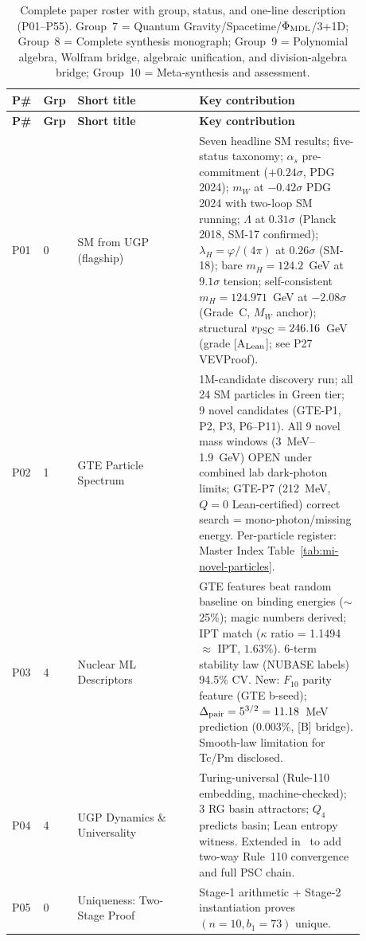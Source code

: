 \documentclass[11pt]{article}
\begin{document}
\footnotesize
\begin{longtable}{@{}P{0.05\linewidth}P{0.05\linewidth}P{0.33\linewidth}P{0.45\linewidth}@{}}
\caption{Complete paper roster with group, status, and one-line description (P01--P55). Group~7 = Quantum Gravity/Spacetime/$\Phi_{\rm MDL}$/3+1D; Group~8 = Complete synthesis monograph; Group~9 = Polynomial algebra, Wolfram bridge, algebraic unification, and division-algebra bridge; Group~10 = Meta-synthesis and assessment.}
\label{tab:all_papers}\\
\toprule
\textbf{P\#} & \textbf{Grp} & \textbf{Short title} & \textbf{Key contribution} \\
\midrule
\endfirsthead
\toprule
\textbf{P\#} & \textbf{Grp} & \textbf{Short title} & \textbf{Key contribution} \\
\midrule
\endhead
\bottomrule
\endfoot
P01 & 0 & SM from UGP (flagship) & Seven headline SM results; five-status taxonomy; $\alpha_s$ pre-commitment ($+0.24\sigma$, PDG 2024); $m_W$ at $-0.42\sigma$ PDG 2024 with two-loop SM running; $\Lambda$ at $0.31\sigma$ (Planck 2018, SM-17 confirmed); $\lambda_H = \varphi/(4\pi)$ at $0.26\sigma$ (SM-18); bare $m_H = 124.2$~GeV at $9.1\sigma$ tension; self-consistent $m_H = 124.971$~GeV at $-2.08\sigma$ (Grade~C, $M_W$ anchor); structural $v_{\rm PSC}=246.16$~GeV (grade [A$_{\rm Lean}$]; see P27 VEVProof). \\
P02 & 1 & GTE Particle Spectrum & 1M-candidate discovery run; all 24 SM particles in Green tier; 9 novel candidates (GTE-P1, P2, P3, P6--P11).  All 9 novel mass windows (3~MeV–1.9~GeV) OPEN under combined lab dark-photon limits; GTE-P7 (212~MeV, $Q=0$ Lean-certified) correct search = mono-photon/missing energy.  Per-particle register: Master Index Table~\ref{tab:mi-novel-particles}. \\
P03 & 4 & Nuclear ML Descriptors & GTE features beat random baseline on binding energies ($\sim$25\%); magic numbers derived; IPT match ($\kappa$ ratio = 1.1494 $\approx$ IPT, $1.63\%$). 6-term stability law (NUBASE labels) 94.5\% CV. New: $F_{10}$ parity feature (GTE b-seed); $\Delta_{\rm pair} = 5^{3/2} = 11.18$~MeV prediction ($0.003\%$, [B] bridge). Smooth-law limitation for Tc/Pm disclosed. \\
P04 & 4 & UGP Dynamics \& Universality & Turing-universal (Rule-110 embedding, machine-checked); 3 RG basin attractors; $Q_4$ predicts basin; Lean entropy witness. Extended in~\cite{SpivackCompUniversality} to add two-way Rule~110 convergence and full PSC chain. \\
P05 & 0 & Uniqueness: Two-Stage Proof & Stage-1 arithmetic + Stage-2 instantiation proves $(n=10, b_1=73)$ unique. \\

\end{longtable}
\end{document}
